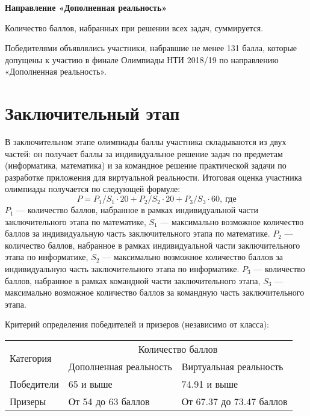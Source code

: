 \textbf{Направление «Дополненная реальность»}

Количество баллов, набранных при решении всех задач, суммируется.

Победителями объявлялись участники, набравшие не менее 131 балла, которые допущены к участию в финале Олимпиады НТИ 2018/19 по направлению «Дополненная реальность».

\section{Заключительный этап}

В заключительном этапе олимпиады баллы участника складываются из двух частей: он получает баллы за индивидуальное решение задач по предметам (информатика, математика) и за командное решение практической задачи по разработке приложения для виртуальной реальности. Итоговая оценка участника олимпиады получается по следующей формуле:
$$P = P_1/S_1 \cdot 20 + P_2/S_2 \cdot 20 + P_3/S_3 \cdot 60, \: \text{где}$$
$P_1$ — количество баллов, набранное в рамках индивидуальной части заключительного этапа по математике,
$S_1$ — максимально возможное количество баллов за индивидуальную часть заключительного этапа по математике.
$P_2$ — количество баллов, набранное в рамках индивидуальной части заключительного этапа по информатике,
$S_2$ — максимально возможное количество баллов за индивидуальную часть заключительного этапа по информатике.
$P_3$ — количество баллов, набранное в рамках командной части заключительного этапа,
$S_3$ — максимально возможное количество баллов за командную часть заключительного этапа.

Критерий определения победителей и призеров (независимо от класса):
\begin{center}
    \begin{tabular}{|l|l|l|}
        \hline
        \multirow{2}{*}{Категория}& \multicolumn{2}{|c|}{Количество баллов} \\
        \cline{2-3}
        &Дополненная реальность& Виртуальная реальность \\
        \hline
        Победители&65 и выше& 74.91 и выше\\
        \hline
        Призеры&От 54 до 63 баллов&От 67.37 до 73.47 баллов \\
        \hline
    \end{tabular}
\end{center}

